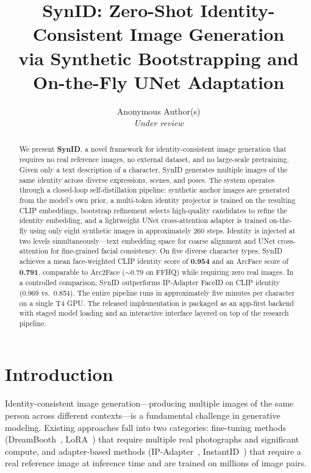 \documentclass[10pt,twocolumn]{article}
\title{\textbf{SynID: Zero-Shot Identity-Consistent Image Generation\\
via Synthetic Bootstrapping and On-the-Fly UNet Adaptation}}
\author{
Anonymous Author(s)\\
\textit{Under review}
}
\date{}
\begin{document}
\maketitle

\begin{abstract}
We present \textbf{SynID}, a novel framework for identity-consistent image generation that requires no real reference images, no external dataset, and no large-scale pretraining. Given only a text description of a character, SynID generates multiple images of the same identity across diverse expressions, scenes, and poses. The system operates through a closed-loop self-distillation pipeline: synthetic anchor images are generated from the model's own prior, a multi-token identity projector is trained on the resulting CLIP embeddings, bootstrap refinement selects high-quality candidates to refine the identity embedding, and a lightweight UNet cross-attention adapter is trained on-the-fly using only eight synthetic images in approximately 260 steps. Identity is injected at two levels simultaneously---text embedding space for coarse alignment and UNet cross-attention for fine-grained facial consistency. On five diverse character types, SynID achieves a mean face-weighted CLIP identity score of \textbf{0.954} and an ArcFace score of \textbf{0.791}, comparable to Arc2Face ($\sim$0.79 on FFHQ) while requiring zero real images. In a controlled comparison, SynID outperforms IP-Adapter FaceID on CLIP identity (0.969 vs.\ 0.854). The entire pipeline runs in approximately five minutes per character on a single T4 GPU. The released implementation is packaged as an app-first backend with staged model loading and an interactive interface layered on top of the research pipeline.
\end{abstract}

\section{Introduction}

Identity-consistent image generation---producing multiple images of the same person across different contexts---is a fundamental challenge in generative modeling. Existing approaches fall into two categories: fine-tuning methods (DreamBooth~\cite{ruiz2023dreambooth}, LoRA~\cite{hu2022lora}) that require multiple real photographs and significant compute, and adapter-based methods (IP-Adapter~\cite{ye2023ipadapter}, InstantID~\cite{wang2024instantid}) that require a real reference image at inference time and are trained on millions of image pairs.
\end{document}

